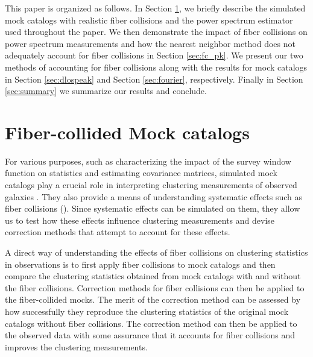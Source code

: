 This paper is organized as follows. 
In Section \ref{sec:catalog}, we briefly describe the simulated mock catalogs 
with realistic fiber collisions and the power spectrum estimator used throughout 
the paper. We then demonstrate the impact of fiber collisions on power spectrum 
measurements and how the nearest neighbor method does not adequately account 
for fiber collisions in Section \ref{sec:fc_pk}. We present our two methods 
of accounting for fiber collisions along with the results for mock catalogs in 
Section \ref{sec:dlospeak} and Section \ref{sec:fourier}, respectively. Finally 
in Section \ref{sec:summary} we summarize our results and conclude. 

\section{Fiber-collided Mock catalogs} \label{sec:catalog}
For various purposes, such as characterizing the impact of the survey window function on statistics and estimating covariance matrices, simulated mock 
catalogs play a crucial role in interpreting  
clustering measurements of observed galaxies 
\citep[][also see citations in \citealt{Chuang:2015aa}]{
Cole:1998aa, 
Scoccimarro:2002aa, 
Anderson:2012aa, 
Beutler:2014aa, 
Carretero:2015aa}. 
They also provide a means of understanding systematic effects such as  
fiber collisions (\citealt{Guo:2012aa, Manera:2013aa}).
Since systematic effects can be simulated on them, they allow us to test 
how these effects influence clustering measurements and devise correction 
methods that attempt to account for these effects.

A direct way of understanding the effects of fiber collisions on clustering 
statistics in observations is to first apply fiber collisions to mock catalogs
and then compare the clustering statistics obtained from mock catalogs with 
and without the fiber collisions. Correction methods for fiber collisions can 
then be applied to the fiber-collided mocks. The merit of the correction 
method can be assessed by how successfully they reproduce the clustering statistics 
of the original mock catalogs without fiber collisions. The correction 
method can then be applied to the observed data with some assurance that it 
accounts for fiber collisions and improves the clustering measurements. 

